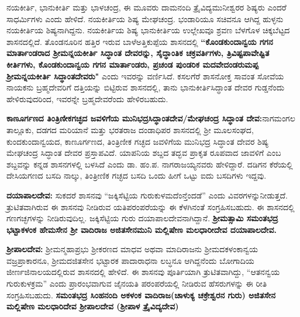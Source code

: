 \vskip 3pt

ನಯಕೀರ್ತಿ, ಭಾನುಕೀರ್ತಿ ಮತ್ತು ಭಾಳಚಂದ್ರ, ಈ ಮೂವರು ದಾಮನಂದಿ ತ್ರೈವಿದ್ಯಮುನೀಶ್ವರರ ಶಿಷ್ಯರು ಎಂದರೆ ಸಾಧರ್ಮಿಗಳು ಎಂದು ಹೇಳಿದೆ. ನಯಕೀರ್ತಿಯ ಶಿಷ್ಯ ಮೇಘಚಂದ್ರ. ಭಂಡಾರಿಯೂ ಸಚಿವನೂ ಆಗಿದ್ದ ಹುಳ್ಳನು ನಯಕೀರ್ತಿಯ ಶಿಷ್ಯನಾಗಿದ್ದನು. ನಯಕೀರ್ತಿಯ ಶಿಷ್ಯ ಭಾನುಕೀರ್ತಿಯ ಉಲ್ಲೇಖವೂ ಶ್ರವಣ ಬೆಳಗೊಳ ಚಿಕ್ಕಬೆಟ್ಟದ ಶಾಸನದಲ್ಲಿದೆ. ತೊಂಡನೂರಿನ ಹತ್ತಿರ ಇರುವ ಬಾಳೆಅತ್ತಿಕುಪ್ಪೆಯ ಶಾಸನದಲ್ಲಿ \textbf{“ಕೊಂಡಕುಂದಾನ್ವಯ ಗಗನ ಮಾರ್ತಾಂಡರಾದ ಶ‍್ರೀಮನ್ನಯಕೀರ್ತಿ ಸಿದ್ಧಾಂತ ದೇವರನ್ನು, ಸೈದ್ಧಾಂತಿಕ ಚಕ್ರವರ್ತಿಗಳು, ತ್ರಿವಿಷ್ಟಪಾವೇಷ್ಟಿತ ಕೀರ್ತಿಗಳು, ಕೊಂಡಕುಂದಾನ್ವಯ ಗಗನ ಮಾರ್ತಾಂಡರು, ಪ್ರಚಂಡ ಪುಂಡರಿಕ ಮದವೇದಂಡರುಮಪ್ಪ ಶ‍್ರೀಮನ್ನಯಕೀರ್ತಿ ಸಿದ್ಧಾಂತದೇವರು"} ಎಂದು ಇವರನ್ನು ವರ್ಣಿಸಿದೆ. ಕಸಲಗೆರೆ ಶಾಸನೋಕ್ತ ಸಾವಂತ ಸೋವೆಯ ನಾಯಕನು ಬ್ರಹ್ಮದೇವರಿಗೆ ದತ್ತಿಯನ್ನು ಬಿಟ್ಟಿರುವ ಶಾಸನದಲ್ಲಿ, ತಾನು ಭಾನುಕೀರ್ತಿಸಿದ್ಧಾಂತ ದೇವರ ಗುಡ್ಡನೆಂದು ಹೇಳಿರುವುದರಿಂದ, ಇವರನ್ನೇ ಬ್ರಹ್ಮದೇವರೆಂದು ಹೇಳಿರಬಹುದು.

\vskip 3pt

\textbf{ಕಾಣೂರ್ಗಣದ ತಿಂತ್ರಿಣೀಕಗಚ್ಛದ ಜವಳಿಗೆಯ ಮುನಿಭದ್ರಸಿದ್ಧಾಂತದೇವ/ಮೇಘಚಂದ್ರ ಸಿದ್ಧಾಂತ ದೇವ:}\break ನಾಗಮಂಗಲ ತಾಲ್ಲೂಕು, ದಡಗದ ಮರಿಯಾನೆ ಮತ್ತು ಭರತರಾಜ ದಂಡಾಧಿಪರ ಶಾಸನದಲ್ಲಿ ಶ‍್ರೀ ಮೂಲಸಂಘದ, ಕುಂದಕುಂದಾನ್ವಯದ, ಕಾಣೂರ್ಗಣದ, ತಿಂತ್ರಿಣೀಕ ಗಚ್ಛದ ಜವಳಿಗೆಯ ಮುನಿಭದ್ರ ಸಿದ್ಧಾಂತ ದೇವರ ಶಿಷ್ಯ ಮೇಘಚಂದ್ರ ಸಿದ್ಧಾಂತ ದೇವರ ಪ್ರಸ್ತಾಪವಿದೆ. ಯಾಪನಿಯ ಶಬ್ದದ ತದ್ಭವ ಪ್ರಾಕೃತ ರೂಪವಾದ ಜಾವಳಿಗೆ ಎಂಬ ಶಬ್ದವನ್ನು ಕನ್ನಡ ಶಾಸನಗಳಲ್ಲಿ ಬಳಸಿದೆ ಎಂದು ಡಾ. ಹಂ.ಪ. ನಾಗರಾಜಯ್ಯನವರು ಹೇಳಿದ್ದಾರೆ. ದಡಿಗನ ಕೆರೆಯಲ್ಲಿ ದೇಸಿಯಗಣದ ಬಸದಿ ನಾಲ್ಕು, ತಿಂತ್ರೀಣಿಕ ಗಚ್ಛದ ಬಸದಿ ಒಂದು ಹೀಗೆ ಒಟ್ಟು ಐದು ಬಸದಿಗಳು ಇದ್ದವು.

\textbf{ದಯಾಪಾಲದೇವ:} ಸುಕದರೆ ಶಾಸನವು “ಜಕ್ಕಿಸೆಟ್ಟಿಯ ಗುರುಕುಳಮದೆಂನ್ತೆಂದಡೆ” ಎಂದು ವಿವರಗಳನ್ನು\break ನೀಡುತ್ತದೆ. ತ್ರುಟಿತವಾಗಿರುವ ಈ ಶಾಸನವು ನೀಡಿರುವ ಯತಿಪರಂಪರೆಯನ್ನು ಈ ಕೆಳಗಿನಂತೆ ಸಂಗ್ರಹಿಸಬಹುದು. ಈ ಶಾಸನದಲ್ಲಿ ಗಣಗಚ್ಛಗಳನ್ನು ನೀಡಿರುವುದಿಲ್ಲ. ಜಕ್ಕಿಸೆಟ್ಟಿಯ ಗುರು ದಯಾಪಾಲದೇವನಾಗಿದ್ದಾನೆ. \textbf{ಶ‍್ರೀಮತ್ಸಾಮಿ ಸಮಂತಭದ್ರ \general{\enginline{-}} ಭಟ್ಟಾಕಳಂಕ \general{\enginline{-}} ಹೇಮಸೇನ \general{\enginline{-}} ಶ‍್ರೀ ವಾದಿರಾಜ \general{\enginline{-}} ಅಜಿತಸೇನಮುನಿ \general{\enginline{-}} ಮಲ್ಲಿಷೇಣ ಮಲಧಾರೀದೇವ \general{\enginline{-}} ದಯಾಪಾಲದೇವ. }

\textbf{ಶ‍್ರೀಪಾಲದೇವ:} ಶ‍್ರೀಮನ್ಮಹಾಪ್ರಭು ಶ‍್ರೀಕರಣದ ಮಾಧವ ಅಥವಾ ಮಾದಿರಾಜನು ಶ‍್ರೀಮದಕಳಂಕಾನ್ವಯ ವಜ್ರಪ್ರಾಕಾರನೂ, ಶ‍್ರೀಮದಜಿತಸೇನ ಭಟ್ಟಾರಕ ಪಾದಾರಾಧನಾ ಲಬ್ಧನೂ ಆಗಿದ್ದನೆಂದು ಬೋಗಾದಿಯ ಜೀರ್ಣಜಿನಾಲಯ\-ದಲ್ಲಿರುವ ಶಾಸನದಲ್ಲಿ ಹೇಳಿದೆ. ಈ ಶಾಸನವು ಪೂರ್ತಿಯಾಗಿ ತ್ರುಟಿತವಾಗಿದ್ದು, “ಆತನನ್ವಯ ಗುರುಕುಳಕ್ರಮ” ಎಂದು ಪ್ರಾರಂಭವಾಗುವ ಜೈನಯತಿ ಪರಂಪರೆಯಲ್ಲಿ ನೀಡಿರುವ ಹೆಸರುಗಳನ್ನು ಈ ರೀತಿ ಸಂಗ್ರಹಿಸಬಹುದು. \textbf{ಸಮಂತಭದ್ರ \general{\enginline{-}} ಸಿಂಹನಂದಿ \general{\enginline{-}} ಅಕಳಂಕ \general{\enginline{-}} ವಾದಿರಾಜ(ಚಾಳುಕ್ಯ ಚಕ್ರೇಶ್ವರನ ಗುರು) \general{\enginline{-}} ಅಜಿತಸೇನ \general{\enginline{-}} ಮಲ್ಲಿಷೇಣ ಮಲಧಾರಿದೇವ \general{\enginline{-}} ಶ‍್ರೀಪಾಲದೇವ (ಶ‍್ರೀಪಾಳ ತ್ರೈವಿದ್ಯದೇವ) }

